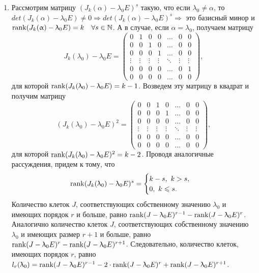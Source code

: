 \begin{Proof}
\begin{enumerate}
		\item Рассмотрим матрицу $(J_k(\alpha) - \lambda_0 E)^s$ такую, что если $\lambda_0 \ne \alpha$, то $det(J_k(\alpha) - \lambda_0 E)\ne 0 \Rightarrow det(J_k(\alpha) - \lambda_0 E)^s\Rightarrow$ это базисный минор и $\operatorname{rank} (J_k(\upalpha) - \uplambda_0 E) = k\quad \forall s \in \mathbb{N}$. А в случае, если $\alpha = \lambda_0$, получаем матрицу $$J_k(\lambda_0) - \lambda_0 E = 
		\begin{pmatrix} 
			0 & 1 & 0 & 0 & \dots & 0 & 0 \\
			0 & 0 & 1 & 0 & \dots & 0 & 0 \\
			0 & 0 & 0 & 1 & \dots & 0 & 0 \\
			\vdots & \vdots & \vdots & \vdots & \ddots & \vdots & \vdots\\
			0 & 0 & 0 & 0 & \dots & 0 & 1 \\
			0 & 0 & 0 & 0 & \dots & 0 & 0
		\end{pmatrix},$$ для которой $\operatorname{rank} (J_k(\uplambda_0) - \uplambda_0 E) = k-1$. Возведем эту матрицу в квадрат и получим матрицу $$(J_k(\lambda_0) - \lambda_0 E)^2 = \begin{pmatrix} 
			0 & 0 & 1 & 0 & \dots & 0 & 0 \\
			0 & 0 & 0 & 1 & \dots & 0 & 0 \\
			0 & 0 & 0 & 0 & \dots & 0 & 0 \\
			\vdots & \vdots & \vdots & \vdots & \ddots & \vdots & \vdots\\
			0 & 0 & 0 & 0 & \dots & 0 & 0 \\
			0 & 0 & 0 & 0 & \dots & 0 & 0
		\end{pmatrix},$$ для которой $\operatorname{rank} (J_k(\uplambda_0) - \uplambda_0 E)^2 = k-2$. Проводя аналогичные рассуждения, придем к тому, что $$\operatorname{rank} (J_k(\uplambda_0) - \uplambda_0 E)^s = \begin{cases}
			k - s,\ k > s,\\
			0,\ k \leqslant s.
		\end{cases}$$
		Количество клеток $J$, соответствующих собственному значению $\lambda_0$ и имеющих порядок $r$ и больше, равно $\operatorname{rank} (J-\uplambda_0 E)^{r-1} - \operatorname{rank} (J-\uplambda_0 E)^r$. Аналогично количество клеток $J$, соответствующих собственному значению $\lambda_0$ и имеющих размер $r + 1$ и больше, равно $\operatorname{rank} (J-\uplambda_0 E)^{r} - \operatorname{rank} (J-\uplambda_0 E)^{r+1}$. Следовательно, количество клеток, имеющих порядок $r$, равно $l_r(\uplambda_0) = \operatorname{rank} (J - \uplambda_0 E)^{r - 1} - 2\cdot \operatorname{rank} (J - \uplambda_0 E)^{r} + \operatorname{rank} (J - \uplambda_0 E)^{r + 1}$.\\

\end{enumerate}
\end{Proof}
